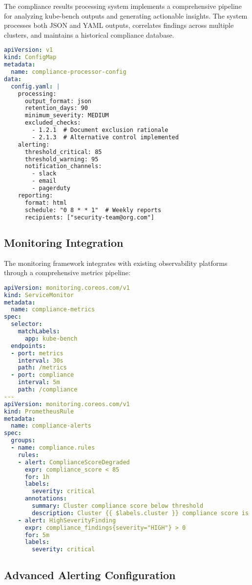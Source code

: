 \documentclass[PMO,lsstdraft,authoryear,toc]{lsstdoc}
\begin{document}
The compliance results processing system implements a comprehensive pipeline for analyzing kube-bench outputs and generating actionable insights. The system processes both JSON and YAML outputs, correlates findings across multiple clusters, and maintains a historical compliance database.

\begin{lstlisting}[language=yaml]
apiVersion: v1
kind: ConfigMap
metadata:
  name: compliance-processor-config
data:
  config.yaml: |
    processing:
      output_format: json
      retention_days: 90
      minimum_severity: MEDIUM
      excluded_checks:
        - 1.2.1  # Document exclusion rationale
        - 2.1.3  # Alternative control implemented
    alerting:
      threshold_critical: 85
      threshold_warning: 95
      notification_channels:
        - slack
        - email
        - pagerduty
    reporting:
      format: html
      schedule: "0 8 * * 1"  # Weekly reports
      recipients: ["security-team@org.com"]
\end{lstlisting}

\subsection{Monitoring Integration}

The monitoring framework integrates with existing observability platforms through a comprehensive metrics pipeline:

\begin{lstlisting}[language=yaml]
apiVersion: monitoring.coreos.com/v1
kind: ServiceMonitor
metadata:
  name: compliance-metrics
spec:
  selector:
    matchLabels:
      app: kube-bench
  endpoints:
  - port: metrics
    interval: 30s
    path: /metrics
  - port: compliance
    interval: 5m
    path: /compliance
---
apiVersion: monitoring.coreos.com/v1
kind: PrometheusRule
metadata:
  name: compliance-alerts
spec:
  groups:
  - name: compliance.rules
    rules:
    - alert: ComplianceScoreDegraded
      expr: compliance_score < 85
      for: 1h
      labels:
        severity: critical
      annotations:
        summary: Cluster compliance score below threshold
        description: Cluster {{ $labels.cluster }} compliance score is {{ $value }}
    - alert: HighSeverityFinding
      expr: compliance_findings{severity="HIGH"} > 0
      for: 5m
      labels:
        severity: critical
\end{lstlisting}

\subsection{Advanced Alerting Configuration}
\end{document}
